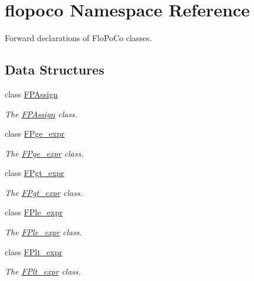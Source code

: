 \hypertarget{namespaceflopoco}{}\section{flopoco Namespace Reference}
\label{namespaceflopoco}


Forward declarations of Flo\+Po\+Co classes.  


\subsection*{Data Structures}
\begin{DoxyCompactItemize}
\item 
class \hyperlink{classflopoco_1_1FPAssign}{F\+P\+Assign}
\begin{DoxyCompactList}\small\item\em The \hyperlink{classflopoco_1_1FPAssign}{F\+P\+Assign} class. \end{DoxyCompactList}\item 
class \hyperlink{classflopoco_1_1FPge__expr}{F\+Pge\+\_\+expr}
\begin{DoxyCompactList}\small\item\em The \hyperlink{classflopoco_1_1FPge__expr}{F\+Pge\+\_\+expr} class. \end{DoxyCompactList}\item 
class \hyperlink{classflopoco_1_1FPgt__expr}{F\+Pgt\+\_\+expr}
\begin{DoxyCompactList}\small\item\em The \hyperlink{classflopoco_1_1FPgt__expr}{F\+Pgt\+\_\+expr} class. \end{DoxyCompactList}\item 
class \hyperlink{classflopoco_1_1FPle__expr}{F\+Ple\+\_\+expr}
\begin{DoxyCompactList}\small\item\em The \hyperlink{classflopoco_1_1FPle__expr}{F\+Ple\+\_\+expr} class. \end{DoxyCompactList}\item 
class \hyperlink{classflopoco_1_1FPlt__expr}{F\+Plt\+\_\+expr}
\begin{DoxyCompactList}\small\item\em The \hyperlink{classflopoco_1_1FPlt__expr}{F\+Plt\+\_\+expr} class. \end{DoxyCompactList}\end{DoxyCompactItemize}
